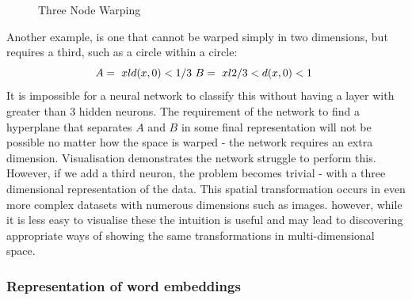 \documentclass[a4paper,11pt,titlepage]{article}
\begin{document}
 		 \begin{figure}[H]
    			\caption{Three Node Warping}%
    			\label{fig:studentprofile}
		\end{figure}
		
 		
		Another example, is one that cannot be warped simply in two dimensions, but requires a third, such as a circle within a circle:
		$$ 
		A = \text{ $ { xld(x,0) < 1/3 } $ }		
		B = \text{ $ { xl2/3 < d(x,0) < 1 } $ }
		$$ 
		It is impossible for a neural network to classify this without having a layer with greater than 3 hidden neurons. The requirement of the network to find a hyperplane that separates $ A $ and $ B $ in some final representation will not be possible no matter how the space is warped - the network requires an extra dimension. Visualisation demonstrates the network struggle to perform this. However, if we add a third  neuron, the problem becomes trivial - with a three dimensional representation of the data. This spatial transformation occurs in even more complex datasets with numerous dimensions \cite{Carlsson2008} such as images. however, while it is less easy to visualise these the intuition is useful and may lead to discovering appropriate ways of showing the same transformations in multi-dimensional space.
		\par 

		\subsubsection{Representation of word embeddings}
 		
 		 \begin{figure}[H]
    			\caption{}%
    			\label{fig:pca}
		\end{figure}
		
\end{document}
